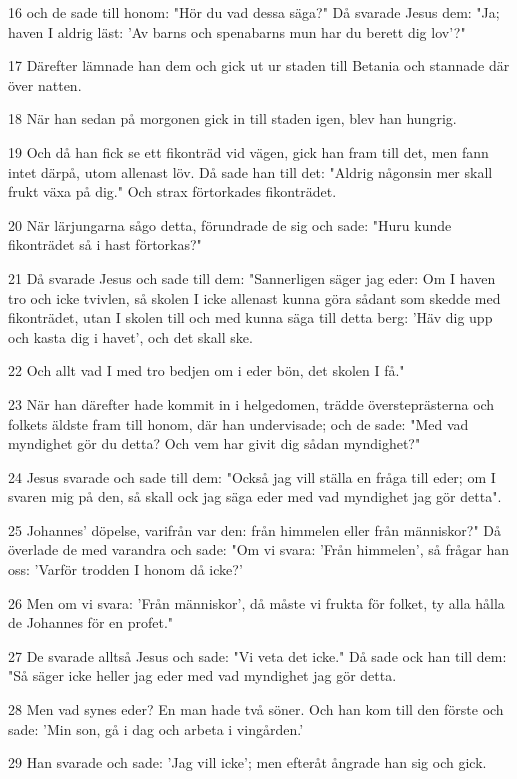 \par 16 och de sade till honom: "Hör du vad dessa säga?" Då svarade Jesus dem: "Ja; haven I aldrig läst: 'Av barns och spenabarns mun har du berett dig lov'?"
\par 17 Därefter lämnade han dem och gick ut ur staden till Betania och stannade där över natten.
\par 18 När han sedan på morgonen gick in till staden igen, blev han hungrig.
\par 19 Och då han fick se ett fikonträd vid vägen, gick han fram till det, men fann intet därpå, utom allenast löv. Då sade han till det: "Aldrig någonsin mer skall frukt växa på dig." Och strax förtorkades fikonträdet.
\par 20 När lärjungarna sågo detta, förundrade de sig och sade: "Huru kunde fikonträdet så i hast förtorkas?"
\par 21 Då svarade Jesus och sade till dem: "Sannerligen säger jag eder: Om I haven tro och icke tvivlen, så skolen I icke allenast kunna göra sådant som skedde med fikonträdet, utan I skolen till och med kunna säga till detta berg: 'Häv dig upp och kasta dig i havet', och det skall ske.
\par 22 Och allt vad I med tro bedjen om i eder bön, det skolen I få."
\par 23 När han därefter hade kommit in i helgedomen, trädde översteprästerna och folkets äldste fram till honom, där han undervisade; och de sade: "Med vad myndighet gör du detta? Och vem har givit dig sådan myndighet?"
\par 24 Jesus svarade och sade till dem: "Också jag vill ställa en fråga till eder; om I svaren mig på den, så skall ock jag säga eder med vad myndighet jag gör detta".
\par 25 Johannes' döpelse, varifrån var den: från himmelen eller från människor?" Då överlade de med varandra och sade: "Om vi svara: 'Från himmelen', så frågar han oss: 'Varför trodden I honom då icke?'
\par 26 Men om vi svara: 'Från människor', då måste vi frukta för folket, ty alla hålla de Johannes för en profet."
\par 27 De svarade alltså Jesus och sade: "Vi veta det icke." Då sade ock han till dem: "Så säger icke heller jag eder med vad myndighet jag gör detta.
\par 28 Men vad synes eder? En man hade två söner. Och han kom till den förste och sade: 'Min son, gå i dag och arbeta i vingården.'
\par 29 Han svarade och sade: 'Jag vill icke'; men efteråt ångrade han sig och gick.
